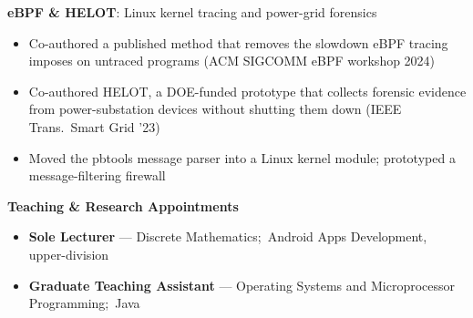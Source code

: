 \documentclass[10pt]{article}
\newcommand{\thread}[1]{%
 \par\needspace{3\baselineskip}\vspace{14pt}%
 {\noindent\fontsize{11}{13}\selectfont\bfseries #1\par}%
}
\newcommand{\project}[3]{%
 \par\needspace{3\baselineskip}\vspace{10pt}%
 {\noindent\hspace*{1.8em}\textbf{#1}#2\hfill\mbox{\small\itshape #3}\par}%
}
\begin{document}
\project{eBPF \& HELOT}{: Linux kernel tracing and power-grid forensics}{}
\begin{itemize}[leftmargin=3em]
 \item Co-authored a published method that removes the slowdown eBPF tracing imposes on untraced programs (ACM SIGCOMM eBPF workshop 2024)
 \item Co-authored HELOT, a DOE-funded prototype that collects forensic evidence from power-substation devices without shutting them down (IEEE Trans.\ Smart Grid '23)
 \item Moved the pbtools message parser into a Linux kernel module; prototyped a message-filtering firewall
\end{itemize}

\thread{Teaching \& Research Appointments}
\begin{itemize}[itemsep=4pt]
 \item \textbf{Sole Lecturer} --- Discrete Mathematics;\, Android Apps Development, upper-division
 \item \textbf{Graduate Teaching Assistant} --- Operating Systems and Microprocessor Programming;\, Java
\end{itemize}
\end{document}
